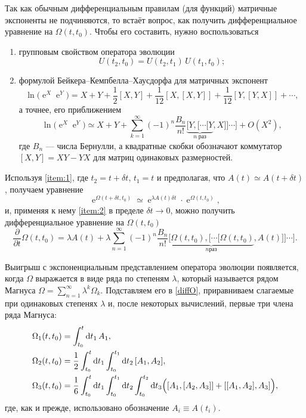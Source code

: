 \documentclass[12pt]{article}
\DeclareMathOperator{\Exp}{e}
\renewcommand\exp\Exp
\begin{document}
Так как обычным дифференциальным правилам (для функций) матричные экспоненты не
подчиняются, то встаёт вопрос, как получить дифференциальное уравнение на
$\Omega(t,t_0)$. Чтобы его составить, нужно воспользоваться
\begin{enumerate}[label=\arabic*),noitemsep]
\item\label{item:1} групповым свойством оператора эволюции
  \begin{equation*}
    U(t_2,t_0)=U(t_2,t_1)\,U(t_1,t_0);
  \end{equation*}
\item\label{item:2} формулой Бейкера–Кемпбелла–Хаусдорфа для матричных экспонент
  \begin{equation*}
    \ln{\big(\exp^{X}\exp^{Y}\big)}=X+Y+\frac{1}{2}[X,Y]+\frac{1}{12}[X,[X,Y]]+
    \frac{1}{12}[Y,[Y,X]]+\cdots,
  \end{equation*}
  а точнее, его приближением
  \begin{equation*}
    \ln{\big(\exp^{X}\exp^{Y}\big)}\simeq
    X+Y+\sum_{k=1}^\infty (-1)^n
    \frac{B_n}{n!}\underbrace{[Y,[\cdots[Y}_{n \;\text{раз}},X]]\cdots]+
    O(X^2),
  \end{equation*}
  где $B_n$ — числа Бернулли, а квадратные скобки обозначают коммутатор
  $[X,Y]=XY-YX$ для матриц одинаковых размерностей.
\end{enumerate}

Используя \ref{item:1}, где $t_2=t+\delta t$, $t_1=t$ и предполагая, что
$A(t)\simeq A(t+\delta t)$, получаем уравнение
\begin{equation}
  \exp^{\Omega(t+\delta t,t_0)}\simeq \exp^{\lambda A(t)\delta t}\cdot \exp^{\Omega(t,t_0)},
\end{equation}
и, применяя к нему \ref{item:2} в пределе $\delta t \to 0$, можно получить
дифференциальное уравнение на $\Omega(t,t_0)$
\begin{equation}\label{diffO}
  \frac{\partial}{\partial t} \Omega(t,t_0) = \lambda A(t) + \lambda
  \sum_{n=1}^\infty (-1)^n\frac{B_n}{n!}
  \underbrace{[\Omega(t,t_0),[\cdots[\Omega(t,t_0)}_{n\text{раз}},
  A(t)]]\cdots].
\end{equation}

Выигрыш с экспоненциальным представлением оператора эволюции появляется, когда
$\Omega$ выражается в виде ряда по степеням $\lambda$, который называется рядом
Магнуса $\Omega=\sum\limits_{n=1}^\infty \lambda^k \Omega_k$. Подставляем его в
\eqref{diffO}, приравниваем слагаемые при одинаковых степенях $\lambda$ и, после
некоторых вычислений, первые три члена ряда Магнуса:
\begin{align}\label{On1}
  \Omega_1(t,t_0)&=\int_{t_0}^t \text{d}t_1\, A_1, \\
  \label{On2}
  \Omega_2(t,t_0)&=\frac{1}{2}\int_{t_0}^t \text{d}t_1 \int_{t_0}^{t_1}
                   \text{d}t_2\, [A_1,A_2],\\
  \label{On3}
  \Omega_3(t,t_0)&=\frac{1}{6}\int_{t_0}^t \text{d}t_1 \int_{t_0}^{t_1}
                   \text{d}t_2
                   \int_{t_0}^{t_2} \text{d}t_3
                   \Bigl([A_1,[A_2,A_3]]+[[A_1,A_2],A_3]\Bigr),
\end{align}
где, как и прежде, использовано обозначение $A_i\equiv A(t_i)$.
\end{document}
